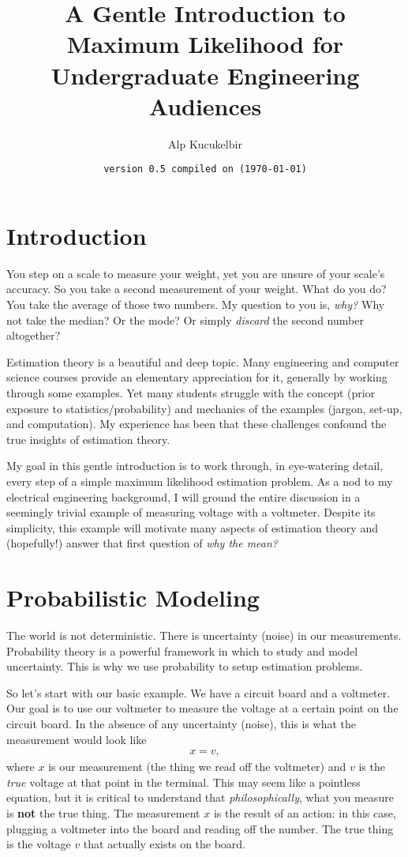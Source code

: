 \documentclass[10pt]{article}
\title{{A Gentle Introduction to Maximum Likelihood for Undergraduate Engineering Audiences}}
\author{Alp Kucukelbir}
\date{\texttt{version 0.5 compiled on (\today)}}
\begin{document}
\maketitle

\section{Introduction}
You step on a scale to measure your weight, yet you are unsure of your scale's accuracy. So you take a second measurement of your weight. What do you do? You take the average of those two numbers. My question to you is, \emph{why?} Why not take the median? Or the mode? Or simply \emph{discard} the second number altogether?

Estimation theory is a beautiful and deep topic. Many  engineering and computer science courses provide an elementary appreciation for it, generally by working through some examples. Yet many students struggle with the concept (prior exposure to statistics/probability) and mechanics of the examples (jargon, set-up, and computation). My experience has been that these challenges confound the true insights of estimation theory.

My goal in this gentle introduction is to work through, in eye-watering detail, every step of a simple maximum likelihood estimation problem. As a nod to my electrical engineering background, I will ground the entire discussion in a seemingly trivial example of measuring voltage with a voltmeter. Despite its simplicity, this example will motivate many aspects of estimation theory and (hopefully!) answer that first question of \emph{why the mean?}

\section{Probabilistic Modeling}
The world is not deterministic. There is uncertainty (noise) in our measurements. Probability theory is a powerful framework in which to study and model uncertainty. This is why we use probability to setup estimation problems.

So let's start with our basic example. We have a circuit board and a voltmeter. Our goal is to use our voltmeter to measure the voltage at a certain point on the circuit board. In the absence of any uncertainty (noise), this is what the measurement would look like
\begin{align}
	x = v,\label{relationshipModel}
\end{align}
where $x$ is our measurement (the thing we read off the voltmeter) and $v$ is the \emph{true} voltage at that point in the terminal. This may seem like a pointless equation, but it is critical to understand that \emph{philosophically}, what you measure is \textbf{not} the true thing. The measurement $x$ is the result of an action: in this case, plugging a voltmeter into the board and reading off the number. The true thing is the voltage $v$ that actually exists on the board.
\end{document}
